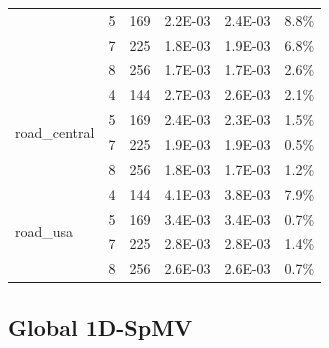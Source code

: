 \documentclass[conference, 10ppt]{IEEEtran}
\begin{document}
\begin{table}[htb]
\begin{tabular}[c]{| l | c | c | c | c | c |}
 &  5  &  169  &  2.2E-03  &  2.4E-03  &  8.8\% \\ \cline{2-6}
 &  7  &  225  &  1.8E-03  &  1.9E-03  &  6.8\% \\ \cline{2-6}
  &  8  &  256  &  1.7E-03  &  1.7E-03  &  2.6\% \\ \hline
\multirow{4}{*}{road\_central}  &  4  &  144  &  2.7E-03  &  2.6E-03  &  2.1\% \\ \cline{2-6}
  &  5  &  169  &  2.4E-03  &  2.3E-03  &  1.5\% \\ \cline{2-6}
  &  7  &  225  &  1.9E-03  &  1.9E-03  &  0.5\% \\ \cline{2-6}
  &  8  &  256  &  1.8E-03  &  1.7E-03  &  1.2\% \\ \hline
\multirow{4}{*}{road\_usa}  &  4  &  144  &  4.1E-03  &  3.8E-03  &  7.9\% \\ \cline{2-6}
  &  5  &  169  &  3.4E-03  &  3.4E-03  &  0.7\% \\ \cline{2-6}
  &  7  &  225  &  2.8E-03  &  2.8E-03  &  1.4\% \\ \cline{2-6}
  &  8  &  256  &  2.6E-03  &  2.6E-03  &  0.7\% \\ \hline
\end{tabular}
\end{table}

\subsection{Global 1D-SpMV}
\end{document}
